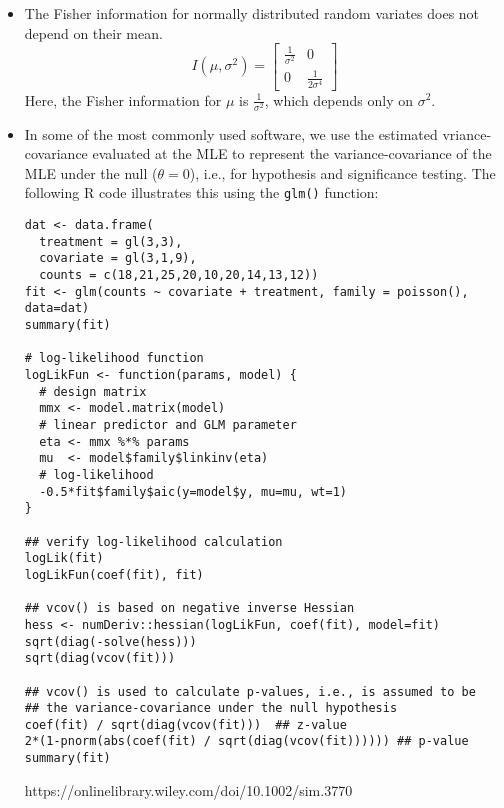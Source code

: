 \documentclass{article}
\begin{document}
\begin{itemize}
\item The Fisher information for normally distributed random variates does not depend on their mean.
\[I(\mu, \sigma^2) = 
\begin{bmatrix}
\frac{1}{\sigma^2} & 0 \\
0 & \frac{1}{2\sigma^4}
\end{bmatrix}
\]
Here, the Fisher information for $\mu$ is $\frac{1}{\sigma^2}$, which depends only on $\sigma^2$.
\item In some of the most commonly used software, we use the estimated vriance-covariance evaluated at the MLE to represent the variance-covariance of the MLE under the null ($\theta = 0$), i.e., for hypothesis and significance testing. The following R code illustrates this using the {\tt glm()} function:
{\small\begin{verbatim}
dat <- data.frame(
  treatment = gl(3,3), 
  covariate = gl(3,1,9), 
  counts = c(18,21,25,20,10,20,14,13,12)) 
fit <- glm(counts ~ covariate + treatment, family = poisson(), data=dat)
summary(fit)

# log-likelihood function
logLikFun <- function(params, model) {
  # design matrix
  mmx <- model.matrix(model)
  # linear predictor and GLM parameter
  eta <- mmx %*% params
  mu  <- model$family$linkinv(eta)
  # log-likelihood
  -0.5*fit$family$aic(y=model$y, mu=mu, wt=1)
}

## verify log-likelihood calculation
logLik(fit)
logLikFun(coef(fit), fit)

## vcov() is based on negative inverse Hessian
hess <- numDeriv::hessian(logLikFun, coef(fit), model=fit)
sqrt(diag(-solve(hess)))
sqrt(diag(vcov(fit)))

## vcov() is used to calculate p-values, i.e., is assumed to be
## the variance-covariance under the null hypothesis
coef(fit) / sqrt(diag(vcov(fit)))  ## z-value
2*(1-pnorm(abs(coef(fit) / sqrt(diag(vcov(fit)))))) ## p-value
summary(fit)
\end{verbatim}}

https://onlinelibrary.wiley.com/doi/10.1002/sim.3770
\end{itemize}
\end{document}
